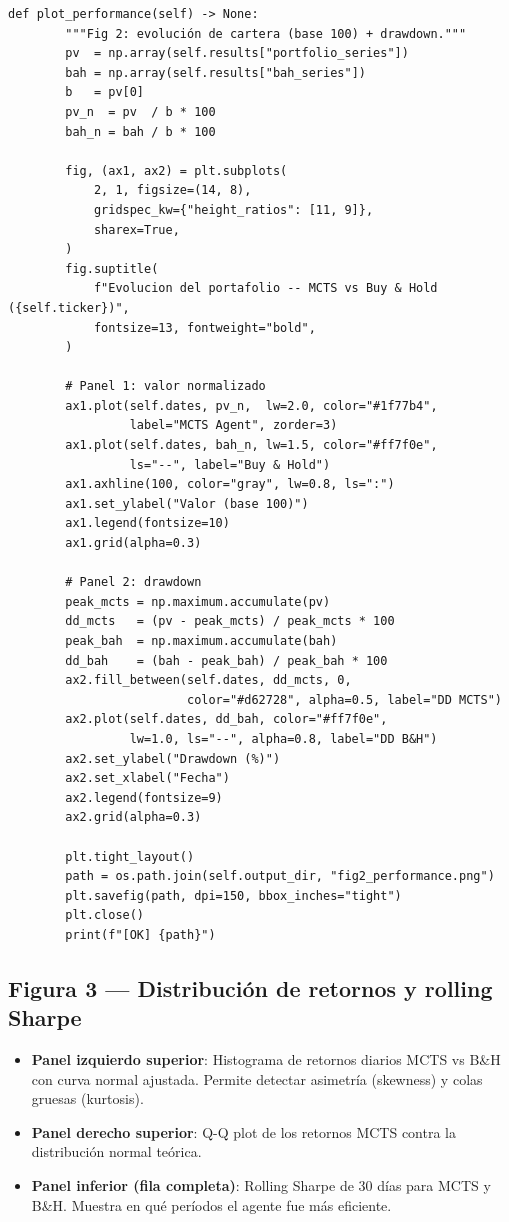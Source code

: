 \documentclass[12pt, a4paper]{article}
\begin{document}
\begin{lstlisting}[caption={Figura 2 -- performance y drawdown}]
    def plot_performance(self) -> None:
        """Fig 2: evolución de cartera (base 100) + drawdown."""
        pv  = np.array(self.results["portfolio_series"])
        bah = np.array(self.results["bah_series"])
        b   = pv[0]
        pv_n  = pv  / b * 100
        bah_n = bah / b * 100

        fig, (ax1, ax2) = plt.subplots(
            2, 1, figsize=(14, 8),
            gridspec_kw={"height_ratios": [11, 9]},
            sharex=True,
        )
        fig.suptitle(
            f"Evolucion del portafolio -- MCTS vs Buy & Hold ({self.ticker})",
            fontsize=13, fontweight="bold",
        )

        # Panel 1: valor normalizado
        ax1.plot(self.dates, pv_n,  lw=2.0, color="#1f77b4",
                 label="MCTS Agent", zorder=3)
        ax1.plot(self.dates, bah_n, lw=1.5, color="#ff7f0e",
                 ls="--", label="Buy & Hold")
        ax1.axhline(100, color="gray", lw=0.8, ls=":")
        ax1.set_ylabel("Valor (base 100)")
        ax1.legend(fontsize=10)
        ax1.grid(alpha=0.3)

        # Panel 2: drawdown
        peak_mcts = np.maximum.accumulate(pv)
        dd_mcts   = (pv - peak_mcts) / peak_mcts * 100
        peak_bah  = np.maximum.accumulate(bah)
        dd_bah    = (bah - peak_bah) / peak_bah * 100
        ax2.fill_between(self.dates, dd_mcts, 0,
                         color="#d62728", alpha=0.5, label="DD MCTS")
        ax2.plot(self.dates, dd_bah, color="#ff7f0e",
                 lw=1.0, ls="--", alpha=0.8, label="DD B&H")
        ax2.set_ylabel("Drawdown (%)")
        ax2.set_xlabel("Fecha")
        ax2.legend(fontsize=9)
        ax2.grid(alpha=0.3)

        plt.tight_layout()
        path = os.path.join(self.output_dir, "fig2_performance.png")
        plt.savefig(path, dpi=150, bbox_inches="tight")
        plt.close()
        print(f"[OK] {path}")
\end{lstlisting}

\subsection{Figura 3 --- Distribución de retornos y rolling Sharpe}

\begin{tcolorbox}[figura, title={Fig.\ 3: \texttt{fig3\_returns.png}}]
\begin{itemize}\small
  \item \textbf{Panel izquierdo superior}: Histograma de retornos diarios MCTS
        vs B\&H con curva normal ajustada. Permite detectar asimetría (skewness)
        y colas gruesas (kurtosis).
  \item \textbf{Panel derecho superior}: Q-Q plot de los retornos MCTS contra la
        distribución normal teórica.
  \item \textbf{Panel inferior (fila completa)}: Rolling Sharpe de 30 días para
        MCTS y B\&H. Muestra en qué períodos el agente fue más eficiente.
\end{itemize}
\end{tcolorbox}
\end{document}
